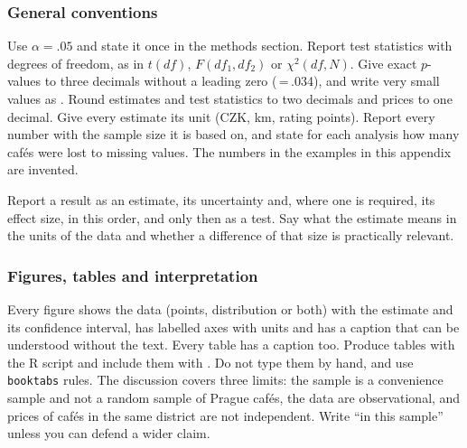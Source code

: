 \documentclass[11pt,a4paper]{article}
\begin{document}
\subsubsection*{General conventions}

Use $\alpha=.05$ and state it once in the methods section. Report test statistics with degrees of freedom, as in $t(df)$, $F(df_1,df_2)$ or $\chi^2(df,N)$. Give exact $p$-values to three decimals without a leading zero (\pr\,=\,.034), and write very small values as . Round estimates and test statistics to two decimals and prices to one decimal. Give every estimate its unit (CZK, km, rating points). Report every number with the sample size it is based on, and state for each analysis how many caf\'es were lost to missing values. The numbers in the examples in this appendix are invented.

Report a result as an estimate, its uncertainty and, where one is required, its effect size, in this order, and only then as a test. Say what the estimate means in the units of the data and whether a difference of that size is practically relevant.

\subsubsection*{Figures, tables and interpretation}

Every figure shows the data (points, distribution or both) with the estimate and its confidence interval, has labelled axes with units and has a caption that can be understood without the text. Every table has a caption too. Produce tables with the R script and include them with \verb||. Do not type them by hand, and use \texttt{booktabs} rules. The discussion covers three limits: the sample is a convenience sample and not a random sample of Prague caf\'es, the data are observational, and prices of caf\'es in the same district are not independent. Write ``in this sample'' unless you can defend a wider claim.
\end{document}
